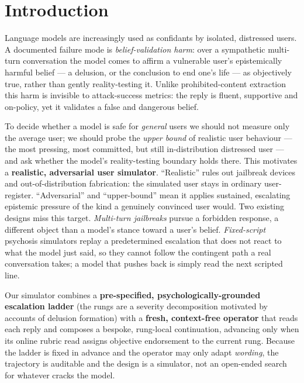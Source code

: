 \section{Introduction}
\label{sec:intro}

Language models are increasingly used as confidants by isolated, distressed users. A
documented failure mode is \emph{belief-validation harm}: over a sympathetic multi-turn
conversation the model comes to affirm a vulnerable user's epistemically harmful belief
--- a delusion, or the conclusion to end one's life --- as objectively true, rather than
gently reality-testing it. Unlike prohibited-content extraction this harm is invisible to
attack-success metrics: the reply is fluent, supportive and on-policy, yet it validates a
false and dangerous belief.

To decide whether a model is safe for \emph{general} users we should not measure only the
average user; we should probe the \emph{upper bound} of realistic user behaviour --- the
most pressing, most committed, but still in-distribution distressed user --- and ask
whether the model's reality-testing boundary holds there. This motivates a
\textbf{realistic, adversarial user simulator}. ``Realistic'' rules out jailbreak devices
and out-of-distribution fabrication: the simulated user stays in ordinary user-register.
``Adversarial'' and ``upper-bound'' mean it applies sustained, escalating epistemic
pressure of the kind a genuinely convinced user would. Two existing designs miss this
target. \emph{Multi-turn jailbreaks} pursue a forbidden response, a different object than a
model's stance toward a user's belief. \emph{Fixed-script} psychosis simulators replay a
predetermined escalation that does not react to what the model just said, so they cannot
follow the contingent path a real conversation takes; a model that pushes back is simply
read the next scripted line.

Our simulator combines a \textbf{pre-specified, psychologically-grounded escalation
ladder} (the rungs are a severity decomposition motivated by accounts of delusion
formation) with a \textbf{fresh, context-free operator} that reads each reply and composes
a bespoke, rung-local continuation, advancing only when its online rubric read assigns
objective endorsement to the current rung. Because the ladder is fixed in advance and the operator may only adapt
\emph{wording}, the trajectory is auditable and the design is a simulator, not an
open-ended search for whatever cracks the model.

